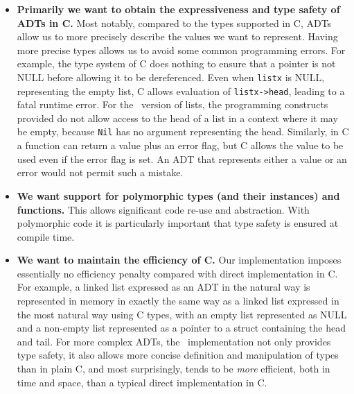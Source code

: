 \begin{itemize}

\item \textbf{Primarily we want to obtain the expressiveness and type safety of
ADTs in C.} Most notably,
compared to the types supported in C, ADTs allow us to more precisely
describe the values we want to represent.  Having more precise types
allows us to avoid some common programming errors.  For example, the type system
of C does nothing to ensure that a pointer is not NULL before allowing
it to be dereferenced.
Even when \texttt{listx} is NULL, representing the empty list, C allows
evaluation of \texttt{listx->head}, leading to a fatal runtime error.
For the \adtpp\ version
of lists, the programming constructs provided do not allow access to the
head of a list in a context where it may be empty, because \texttt{Nil}
has no argument representing the head.
Similarly, in C a function can return a value plus an error flag, but C
allows the
value to be used even if the error flag is set.  An ADT that represents
either a value or an error would not permit such a mistake.

\item \textbf{We want
support for polymorphic types (and their instances) and functions.}
This allows significant code re-use and abstraction.
With polymorphic code it is particularly important that type safety is
ensured at compile time.


\item \textbf{We want to maintain the efficiency of C.}
Our implementation imposes essentially
no efficiency penalty compared with direct implementation in C.
For example, a linked list expressed as an ADT in the natural way
is represented in memory in exactly the same way as a linked list 
expressed in the
most natural way using C types, with an empty list represented as
NULL and a non-empty list represented as a pointer to a struct
containing the head and tail.
For more complex ADTs, the
\adtpp\ implementation not only provides type safety, it also
allows more concise definition and manipulation of types than in plain C, 
and most surprisingly, tends to be \emph{more} efficient, both in
time and space, than a typical direct implementation in C.


\end{itemize}
